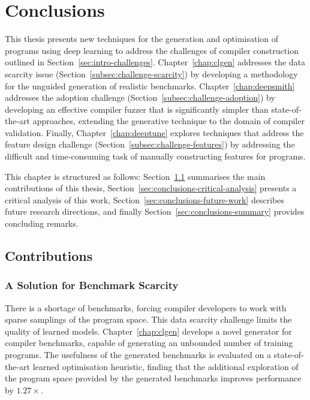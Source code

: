 \chapter{Conclusions}
\label{chap:conclusions}

This thesis presents new techniques for the generation and optimisation of programs using deep learning to address the challenges of compiler construction outlined in Section~\ref{sec:intro-challenges}. Chapter~\ref{chap:clgen} addresses the data scarcity issue (Section~\ref{subsec:challenge-scarcity}) by developing a methodology for the unguided generation of realistic benchmarks. Chapter~\ref{chap:deepsmith} addresses the adoption challenge (Section~\ref{subsec:challenge-adoption}) by developing an effective compiler fuzzer that is significantly simpler than state-of-the-art approaches, extending the generative technique to the domain of compiler validation. Finally, Chapter~\ref{chap:deeptune} explores techniques that address the feature design challenge (Section~\ref{subsec:challenge-features}) by addressing the difficult and time-consuming task of manually constructing features for programs.%

This chapter is structured as follows: Section~\ref{sec:conclusions-contributions} summarises the main contributions of this thesis, Section~\ref{sec:conclusions-critical-analysis} presents a critical analysis of this work, Section~\ref{sec:conclusions-future-work} describes future research directions, and finally Section~\ref{sec:conclusions-summary} provides concluding \linebreak remarks.


\section{Contributions}
\label{sec:conclusions-contributions}



\subsection{A Solution for Benchmark Scarcity}

There is a shortage of benchmarks, forcing compiler developers to work with sparse samplings of the program space. This data scarcity challenge limits the quality of learned models. Chapter~\ref{chap:clgen} develops a novel generator for compiler benchmarks, capable of generating an unbounded number of training programs. The usefulness of the generated benchmarks is evaluated on a state-of-the-art learned optimisation heuristic, finding that the additional exploration of the program space provided by the generated benchmarks improves performance by $1.27\times$.

